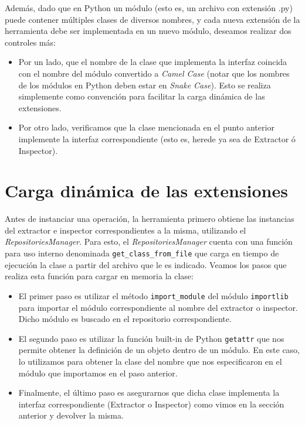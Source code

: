 Además, dado que en Python un módulo (esto es, un archivo con extensión .py) puede contener múltiples clases de diversos nombres, y cada nueva extensión de la herramienta debe ser implementada en un nuevo módulo, deseamos realizar dos controles más:

\begin{itemize}
\item Por un lado, que el nombre de la clase que implementa la interfaz coincida con el nombre del módulo convertido a \emph{Camel Case} (notar que los nombres de los módulos en Python deben estar en \emph{Snake Case}). Esto se realiza simplemente como convención para facilitar la carga dinámica de las extensiones.
\item Por otro lado, verificamos que la clase mencionada en el punto anterior implemente la interfaz correspondiente (esto es, herede ya sea de Extractor ó Inspector).
\end{itemize}

\section{Carga dinámica de las extensiones}
Antes de instanciar una operación, la herramienta primero obtiene las instancias del extractor e inspector correspondientes a la misma, utilizando el \emph{RepositoriesManager}. Para esto, el \emph{RepositoriesManager} cuenta con una función para uso interno denominada \texttt{get\_class\_from\_file} que carga en tiempo de ejecución la clase a partir del archivo que le es indicado. Veamos los pasos que realiza esta función para cargar en memoria la clase:

\begin{itemize}
\item \begin{sloppypar} El primer paso es utilizar el método \texttt{import\_module} del módulo \texttt{importlib} \cite{python-importlib} para importar el módulo correspondiente al nombre del extractor o inspector. Dicho módulo es buscado en el repositorio correspondiente. \end{sloppypar}
\item El segundo paso es utilizar la función built-in de Python \texttt{getattr} que nos permite obtener la definición de un objeto dentro de un módulo. En este caso, lo utilizamos para obtener la clase del nombre que nos especificaron en el módulo que importamos en el paso anterior.
\item Finalmente, el último paso es asegurarnos que dicha clase implementa la interfaz correspondiente (Extractor o Inspector) como vimos en la sección anterior y devolver la misma.
\end{itemize}

